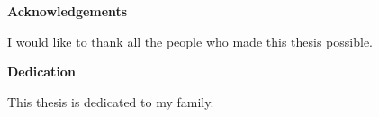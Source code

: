 \cleardoublepage


\begin{center}\textbf{Acknowledgements}\end{center}

I would like to thank all the people who made this thesis possible.
\cleardoublepage


\begin{center}\textbf{Dedication}\end{center}

This thesis is dedicated to my family.
\cleardoublepage

\renewcommand\contentsname{Table of Contents}
\tableofcontents
\cleardoublepage
{}    %

\listoftables
\cleardoublepage
{}		%

\listoffigures
\cleardoublepage
{}		%

\cleardoublepage
{}		%


